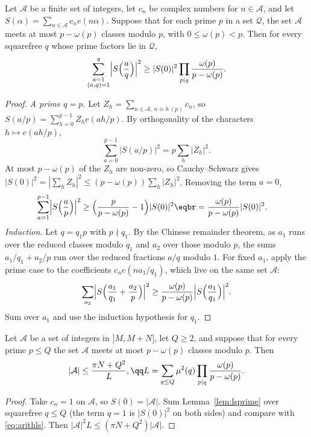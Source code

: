 \begin{lemma}\label{lem:lsprime}
Let $\mathcal A$ be a finite set of integers, let $c_n$ be complex numbers for $n\in\mathcal A$, and let $S(\alpha)=\sum_{n\in\mathcal A}c_ne(n\alpha)$. Suppose that for each prime $p$ in a set $\mathcal Q$, the set $\mathcal A$ meets at most $p-\omega(p)$ classes modulo $p$, with $0\le\omega(p)<p$. Then for every squarefree $q$ whose prime factors lie in $\mathcal Q$,
\[
\sum_{\substack{a=1\\(a,q)=1}}^q\Bigl|S\Bigl(\frac aq\Bigr)\Bigr|^2\ge|S(0)|^2\prod_{p\mid q}\frac{\omega(p)}{p-\omega(p)}.
\]
\end{lemma}
\begin{proof}
\emph{A prime $q=p$.} Let $Z_h=\sum_{n\in\mathcal A,\,n\equiv h\,(p)}c_n$, so $S(a/p)=\sum_{h=0}^{p-1}Z_he(ah/p)$. By orthogonality of the characters $h\mapsto e(ah/p)$,
\[
\sum_{a=0}^{p-1}\bigl|S(a/p)\bigr|^2=p\sum_h|Z_h|^2.
\]
At most $p-\omega(p)$ of the $Z_h$ are non-zero, so Cauchy--Schwarz gives $|S(0)|^2=|\sum_h Z_h|^2\le(p-\omega(p))\sum_h|Z_h|^2$. Removing the term $a=0$,
\[
\begin{aligned}\sum_{a=1}^{p-1}\Bigl|S\Bigl(\frac ap\Bigr)\Bigr|^2&\ge\Bigl(\frac p{p-\omega(p)}-1\Bigr)|S(0)|^2\eqbr=\frac{\omega(p)}{p-\omega(p)}|S(0)|^2.\end{aligned}
\]
\emph{Induction.} Let $q=q_1p$ with $p\nmid q_1$. By the Chinese remainder theorem, as $a_1$ runs over the reduced classes modulo $q_1$ and $a_2$ over those modulo $p$, the sums $a_1/q_1+a_2/p$ run over the reduced fractions $a/q$ modulo $1$. For fixed $a_1$, apply the prime case to the coefficients $c_ne(na_1/q_1)$, which live on the same set $\mathcal A$:
\[
\sum_{a_2}\Bigl|S\Bigl(\frac{a_1}{q_1}+\frac{a_2}p\Bigr)\Bigr|^2\ge\frac{\omega(p)}{p-\omega(p)}\Bigl|S\Bigl(\frac{a_1}{q_1}\Bigr)\Bigr|^2.
\]
Sum over $a_1$ and use the induction hypothesis for $q_1$.
\end{proof}

\begin{theorem}\label{thm:arithls}
Let $\mathcal A$ be a set of integers in $]M,M+N]$, let $Q\ge2$, and suppose that for every prime $p\le Q$ the set $\mathcal A$ meets at most $p-\omega(p)$ classes modulo $p$. Then
\[
\begin{gathered}|\mathcal A|\le\frac{\pi N+Q^2}L,\qq L=\sum_{q\le Q}\mu^2(q)\prod_{p\mid q}\frac{\omega(p)}{p-\omega(p)}.\end{gathered}
\]
\end{theorem}
\begin{proof}
Take $c_n=1$ on $\mathcal A$, so $S(0)=|\mathcal A|$. Sum Lemma~\ref{lem:lsprime} over squarefree $q\le Q$ (the term $q=1$ is $|S(0)|^2$ on both sides) and compare with \eqref{eq:arithls}. Then $|\mathcal A|^2 L\le(\pi N+Q^2)|\mathcal A|$.
\end{proof}

